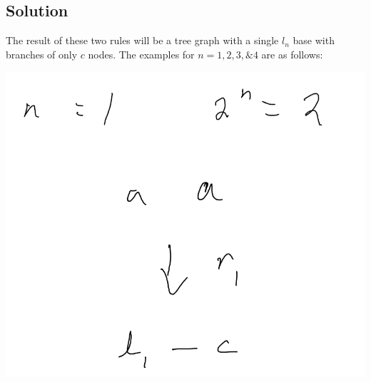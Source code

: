 \documentclass[]{article}
\numberwithin{equation}{section}
\begin{document}
\subsection*{Solution}
The result of these two rules will be a tree graph with a single $l_n$ base with branches of only $c$ nodes. 
The examples for $n=1,2,3,\&4$ are as follows:
\begin{multicols}{3}
    \includegraphics[width=\columnwidth]{figs/pblm6_1.png}

\end{multicols}
\end{document}
